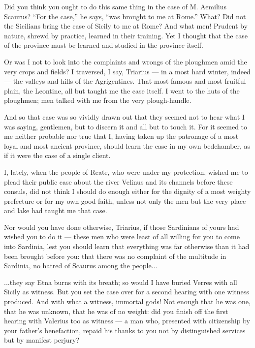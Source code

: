  Did you think you ought to do this same thing in the case of M. Aemilius Scaurus? ``For the case,'' he says, ``was brought to me at Rome.'' What? Did not the Sicilians bring the case of Sicily to me at Rome? And what men! Prudent by nature, shrewd by practice, learned in their training. Yet I thought that the case of the province must be learned and studied in the province itself.

 Or was I not to look into the complaints and wrongs of the ploughmen amid the very crops and fields? I traversed, I say, Triarius --- in a most hard winter, indeed --- the valleys and hills of the Agrigentines. That most famous and most fruitful plain, the Leontine, all but taught me the case itself. I went to the huts of the ploughmen; men talked with me from the very plough-handle.

 And so that case was so vividly drawn out that they seemed not to hear what I was saying, gentlemen, but to discern it and all but to touch it. For it seemed to me neither probable nor true that I, having taken up the patronage of a most loyal and most ancient province, should learn the case in my own bedchamber, as if it were the case of a single client.

 I, lately, when the people of Reate, who were under my protection, wished me to plead their public case about the river Velinus and its channels before these consuls, did not think I should do enough either for the dignity of a most weighty prefecture or for my own good faith, unless not only the men but the very place and lake had taught me that case.

 Nor would you have done otherwise, Triarius, if those Sardinians of yours had wished you to do it --- these men who were least of all willing for you to come into Sardinia, lest you should learn that everything was far otherwise than it had been brought before you: that there was no complaint of the multitude in Sardinia, no hatred of Scaurus among the people...

 ...they say Etna burns with its breath; so would I have buried Verres with all Sicily as witness. But you set the case over for a second hearing with one witness produced. And with what a witness, immortal gods! Not enough that he was one, that he was unknown, that he was of no weight: did you finish off the first hearing with Valerius too as witness --- a man who, presented with citizenship by your father's benefaction, repaid his thanks to you not by distinguished services but by manifest perjury?

